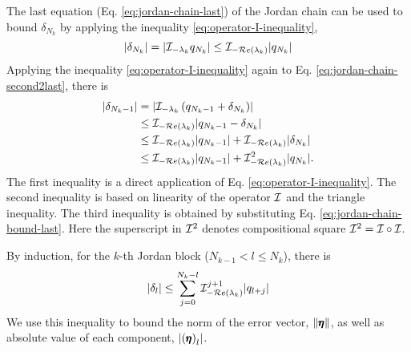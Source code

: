 The last equation (Eq. \eqref{eq:jordan-chain-last}) of the Jordan chain can be used to bound $\delta_{N_k}$ by applying the inequality \eqref{eq:operator-I-inequality}, 
\begin{equation}\label{eq:jordan-chain-bound-last}
    |\delta_{N_k}| = \left|\mathcal{I}_{-\lambda_k}q_{N_k}\right| \leq \mathcal{I}_{-\mathcal{R}e\left(\lambda_k\right)} |q_{N_k}|
\end{equation}
Applying the inequality \eqref{eq:operator-I-inequality} again to Eq. \eqref{eq:jordan-chain-second2last}, there is
\begin{align}
    |\delta_{N_k-1}| &= \left|\mathcal{I}_{-\lambda_k}\left(q_{N_k - 1} + \delta_{N_k}\right)\right| \\
    &\leq \mathcal{I}_{-\mathcal{R}e\left(\lambda_k\right)} |q_{N_k - 1} - \delta_{N_k}| \\
    &\leq \mathcal{I}_{-\mathcal{R}e\left(\lambda_k\right)} |q_{N_k - 1}| + \mathcal{I}_{-\mathcal{R}e\left(\lambda_k\right)} |\delta_{N_k}| \\
    &\leq \mathcal{I}_{-\mathcal{R}e\left(\lambda_k\right)} |q_{N_k - 1}| + \mathcal{I}_{-\mathcal{R}e\left(\lambda_k\right)}^2 |q_{N_k}|.
\end{align}
The first inequality is a direct application of Eq. \eqref{eq:operator-I-inequality}. 
The second inequality is based on linearity of the operator $\mathcal{I}$ and the triangle inequality. 
The third inequality is obtained by substituting Eq. \eqref{eq:jordan-chain-bound-last}.
Here the superscript in $\mathcal{I}^2$ denotes compositional square $\mathcal{I}^2 = \mathcal{I}\circ\mathcal{I}$.

By induction, for the $k$-th Jordan block ($N_{k-1} < l \leq N_k$), there is
\begin{equation}\label{eq:system-scalar-inequality-transformed}
    |\delta_{l}|  \leq \sum_{j=0}^{N_k - l} \mathcal{I}_{-\mathcal{R}e\left(\lambda_k\right)} ^ {j+1} |q_{l+j}|
\end{equation}
We use this inequality to bound the norm of the error vector, $\left\|\pmb{\eta}\right\|$, as well as absolute value of each component, $\left|\left(\pmb{\eta}\right)_l\right|$. 
